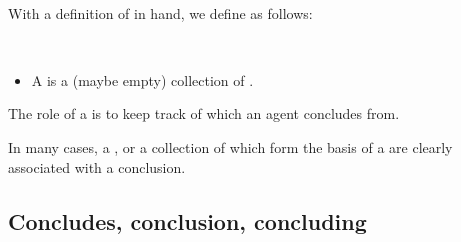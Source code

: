 



\paragraph*{}


\begin{note}
  With a definition of  in hand, we define  as follows:

  \begin{definition}[\pool{3}]
    \label{def:pools}
    \mbox{ }
    \vspace{-\baselineskip}
    \begin{itemize}
    \item
      A \emph{\pool{}} is a (maybe empty) collection of .
    \end{itemize}
    \vspace{-\baselineskip}
  \end{definition}

  \noindent%
  The role of a \pool{} is to keep track of which  an agent concludes from.

  In many cases, a \pool{}, or a collection of \evalN{} which form the basis of a \pool{} are clearly associated with a conclusion.
\end{note}



\subsection{Concludes, conclusion, concluding}
\label{sec:concl-events-which}


